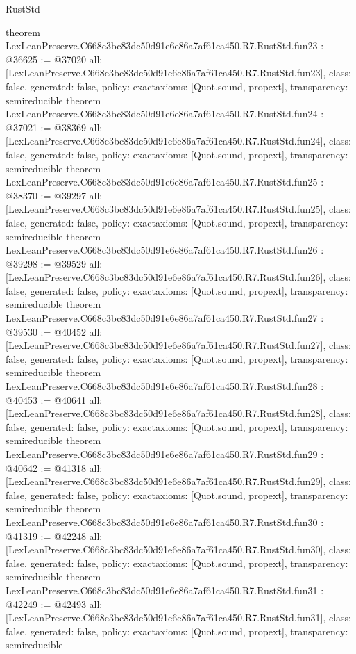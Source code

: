 \begin{lexlean}{RustStd}
\begin{coremodule}
{}
theorem LexLeanPreserve.C668c3bc83dc50d91e6e86a7af61ca450.R7.RustStd.fun23 : @36625 := @37020 {
  all: [LexLeanPreserve.C668c3bc83dc50d91e6e86a7af61ca450.R7.RustStd.fun23],
  class: false,
  generated: false,
  policy: exact{axioms: [Quot.sound, propext]},
  transparency: semireducible
}
theorem LexLeanPreserve.C668c3bc83dc50d91e6e86a7af61ca450.R7.RustStd.fun24 : @37021 := @38369 {
  all: [LexLeanPreserve.C668c3bc83dc50d91e6e86a7af61ca450.R7.RustStd.fun24],
  class: false,
  generated: false,
  policy: exact{axioms: [Quot.sound, propext]},
  transparency: semireducible
}
theorem LexLeanPreserve.C668c3bc83dc50d91e6e86a7af61ca450.R7.RustStd.fun25 : @38370 := @39297 {
  all: [LexLeanPreserve.C668c3bc83dc50d91e6e86a7af61ca450.R7.RustStd.fun25],
  class: false,
  generated: false,
  policy: exact{axioms: [Quot.sound, propext]},
  transparency: semireducible
}
theorem LexLeanPreserve.C668c3bc83dc50d91e6e86a7af61ca450.R7.RustStd.fun26 : @39298 := @39529 {
  all: [LexLeanPreserve.C668c3bc83dc50d91e6e86a7af61ca450.R7.RustStd.fun26],
  class: false,
  generated: false,
  policy: exact{axioms: [Quot.sound, propext]},
  transparency: semireducible
}
theorem LexLeanPreserve.C668c3bc83dc50d91e6e86a7af61ca450.R7.RustStd.fun27 : @39530 := @40452 {
  all: [LexLeanPreserve.C668c3bc83dc50d91e6e86a7af61ca450.R7.RustStd.fun27],
  class: false,
  generated: false,
  policy: exact{axioms: [Quot.sound, propext]},
  transparency: semireducible
}
theorem LexLeanPreserve.C668c3bc83dc50d91e6e86a7af61ca450.R7.RustStd.fun28 : @40453 := @40641 {
  all: [LexLeanPreserve.C668c3bc83dc50d91e6e86a7af61ca450.R7.RustStd.fun28],
  class: false,
  generated: false,
  policy: exact{axioms: [Quot.sound, propext]},
  transparency: semireducible
}
theorem LexLeanPreserve.C668c3bc83dc50d91e6e86a7af61ca450.R7.RustStd.fun29 : @40642 := @41318 {
  all: [LexLeanPreserve.C668c3bc83dc50d91e6e86a7af61ca450.R7.RustStd.fun29],
  class: false,
  generated: false,
  policy: exact{axioms: [Quot.sound, propext]},
  transparency: semireducible
}
theorem LexLeanPreserve.C668c3bc83dc50d91e6e86a7af61ca450.R7.RustStd.fun30 : @41319 := @42248 {
  all: [LexLeanPreserve.C668c3bc83dc50d91e6e86a7af61ca450.R7.RustStd.fun30],
  class: false,
  generated: false,
  policy: exact{axioms: [Quot.sound, propext]},
  transparency: semireducible
}
theorem LexLeanPreserve.C668c3bc83dc50d91e6e86a7af61ca450.R7.RustStd.fun31 : @42249 := @42493 {
  all: [LexLeanPreserve.C668c3bc83dc50d91e6e86a7af61ca450.R7.RustStd.fun31],
  class: false,
  generated: false,
  policy: exact{axioms: [Quot.sound, propext]},
  transparency: semireducible
}
\end{coremodule}
\end{lexlean}
